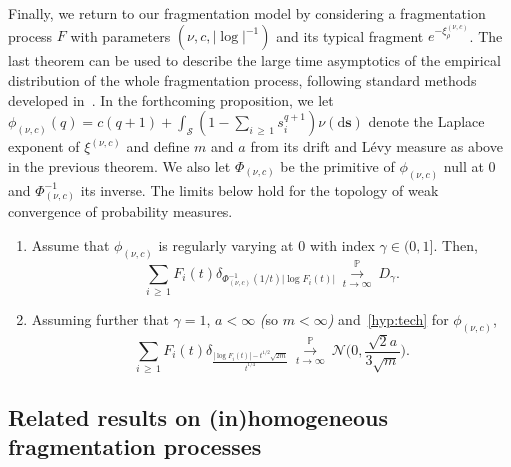 \documentclass[AHL,Unicode,longabstracts,published]{cedram}
\newcommand{\bbP}{\mathbb{P}}
\newcommand{\dd}{\mathrm{d}}
\newcommand{\calS}{\mathcal{S}}
\newcommand{\calN}{\mathcal{N}}
\newcommand{\bfs}{\mathbf{s}}
\newcommand*{\relabel}{\renewcommand{\labelenumi}{(\theenumi)}}
\newcommand*{\romanenumi}{\renewcommand*{\theenumi}{\roman{enumi}}\relabel}
\begin{document}
Finally, we return to our fragmentation model by considering a fragmentation process $F$ with parameters $(\nu,c, |\log|^{-1})$ and its typical fragment $e^{-\xi^{(\nu,c)}_{\rho}}$. The last theorem can be used to describe the large time asymptotics of the empirical distribution of the whole fragmentation process, following standard methods developed in~\cite{BertoinAB03}. In the forthcoming proposition, we let $\phi_{(\nu,c)} (q)=c(q+1)+\int_{\calS} (1-\sum_{i\,\geq\,1} s_i^{q+1})\nu(\dd \bfs)$ denote the Laplace exponent of $\xi^{(\nu,c)}$ and define $m$ and $a$ from its drift and Lévy measure as above in the previous theorem. We also let $\Phi_{(\nu,c)}$ be the primitive of $\phi_{(\nu,c)}$ null at 0 and $\Phi^{-1}_{(\nu,c)}$ its inverse. The limits below hold for the topology of weak convergence of probability measures.

\begin{prop}\label{thm:cvdps}\leavevmode
\begin{enumerate}\romanenumi
\item\label{prop1.9.1} Assume that $\phi_{(\nu,c)}$ is regularly varying at 0 with index $\gamma \in (0,1]$. Then,
\[
\sum_{i\,\geq\,1} F_i(t) \delta_{\Phi_{(\nu,c)}^{-1}(1/t) \left |\log F_i(t) \right|} \ \overset{\bbP}{\underset{t \to \infty}\longrightarrow} \ D_{\gamma}.
\]
\item\label{prop1.9.2} Assuming further that $\gamma = 1$, $a<\infty$ \emph{(}so $m<\infty$\emph{)} and~\eqref{hyp:tech} for $\phi_{(\nu,c)}$,
\[
\sum_{i\,\geq\,1} F_i(t) \delta_{\frac{\left |\log F_i(t) \right| -t^{1/2}\sqrt{2m}}{t^{1/4}}} \ \overset{\bbP}{\underset{t \to \infty}\longrightarrow} \ \calN\Bigg(0,\frac{\sqrt 2 a}{3 \sqrt m}\Bigg).
\]
\end{enumerate}
\end{prop}


\subsection{Related results on (in)homogeneous fragmentation processes}
\end{document}
